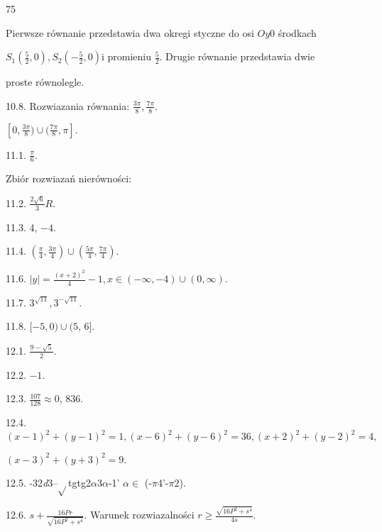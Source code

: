 \documentclass[a4paper,12pt]{article}
\begin{document}
75

Pierwsze równanie przedstawia dwa okregi styczne do osi $Oy 0$ środkach

$S_{1}(\displaystyle \frac{5}{2},0), S_{2}(-\displaystyle \frac{5}{2},0) \mathrm{i}$ promieniu $\displaystyle \frac{5}{2}$. Drugie równanie przedstawia dwie

proste równolegle.

10.8. Rozwiazania równania: $\displaystyle \frac{3\pi}{8}, \displaystyle \frac{7\pi}{8}.$

$[0,\displaystyle \frac{3\pi}{8})\cup(\frac{7\pi}{8},\pi].$

11.1. $\displaystyle \frac{\pi}{6}.$

Zbiór rozwiazań nierówności:

11.2. $\displaystyle \frac{2\sqrt{6}}{3}R.$

11.3. 4, $-4.$

11.4. $(\displaystyle \frac{\pi}{4},\frac{3\pi}{4})\cup(\frac{5\pi}{4},\frac{7\pi}{4}).$

11.6. $|y|=\displaystyle \frac{(x+2)^{2}}{4}-1, x\in(-\infty,-4)\cup(0,\infty).$

11.7. $3^{\sqrt{11}}, 3^{-\sqrt{11}}.$

11.8. $[-5,0)\cup(5$, 6$].$

12.1. $\displaystyle \frac{9-\sqrt{5}}{2}.$

12.2. $-1.$

12.3. $\displaystyle \frac{107}{128}\approx 0$, 836.

12.4. $(x-1)^{2}+(y-1)^{2}=1, (x-6)^{2}+(y-6)^{2}=36, (x+2)^{2}+(y-2)^{2}=4,$

$(x-3)^{2}+(y+3)^{2}=9.$

12.5. -32{\it d}3--$\sqrt{}$tgtg2$\alpha$3$\alpha$-1' $\alpha\in$ (-$\pi$4'-$\pi$2).

12.6. $s+\displaystyle \frac{16Pr}{\sqrt{16P^{2}+s^{4}}}$. Warunek rozwiazalności $r\displaystyle \geq\frac{\sqrt{16P^{2}+s^{4}}}{4s}.$
\end{document}
